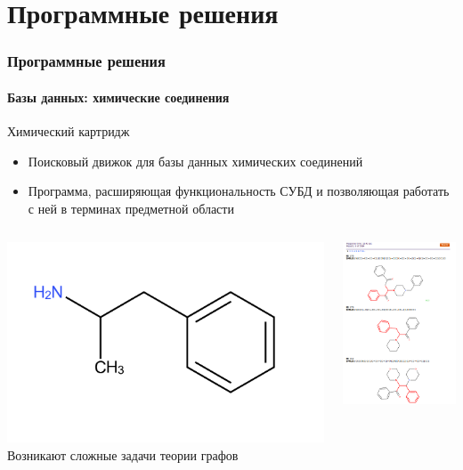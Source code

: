 \section{Программные решения}
\begin{frame}
  \frametitle{Программные решения}
  \framesubtitle{Базы данных: химические соединения}
  Химический картридж
  \begin{itemize}
    \item Поисковый движок для базы данных химических соединений 
    \item Программа, расширяющая функциональность СУБД и позволяющая работать с ней в терминах предметной области
  \end{itemize}
  \begin{columns}
    \begin{column}{0.5\textwidth}
  \includegraphics[scale=0.2]{images/amphetamine.pdf} \\
  Возникают сложные задачи теории графов
\end{column}
\begin{column}{0.5\textwidth}
 \includegraphics[scale=0.38]{images/substructure_search.png}

\end{column}
\end{columns}
\end{frame}
